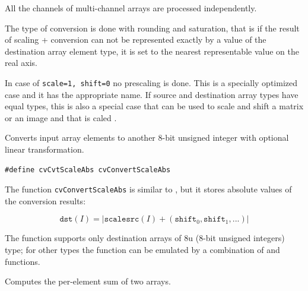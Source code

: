 All the channels of multi-channel arrays are processed independently.

The type of conversion is done with rounding and saturation, that is if the
result of scaling + conversion can not be represented exactly by a value
of the destination array element type, it is set to the nearest representable
value on the real axis.

In case of \texttt{scale=1, shift=0} no prescaling is done. This is a specially
optimized case and it has the appropriate  name. If
source and destination array types have equal types, this is also a
special case that can be used to scale and shift a matrix or an image
and that is caled .

\label{ConvertScaleAbs}

Converts input array elements to another 8-bit unsigned integer with optional linear transformation.


\begin{lstlisting}
#define cvCvtScaleAbs cvConvertScaleAbs
\end{lstlisting}

\begin{description}
\end{description}


The function \texttt{cvConvertScaleAbs} is similar to , but it stores absolute values of the conversion results:

\[
\texttt{dst}(I) = |\texttt{scale} \texttt{src}(I) + (\texttt{shift}_0,\texttt{shift}_1,...)|
\]

The function supports only destination arrays of 8u (8-bit unsigned integers) type; for other types the function can be emulated by a combination of  and  functions.

\label{Add}

Computes the per-element sum of two arrays.


